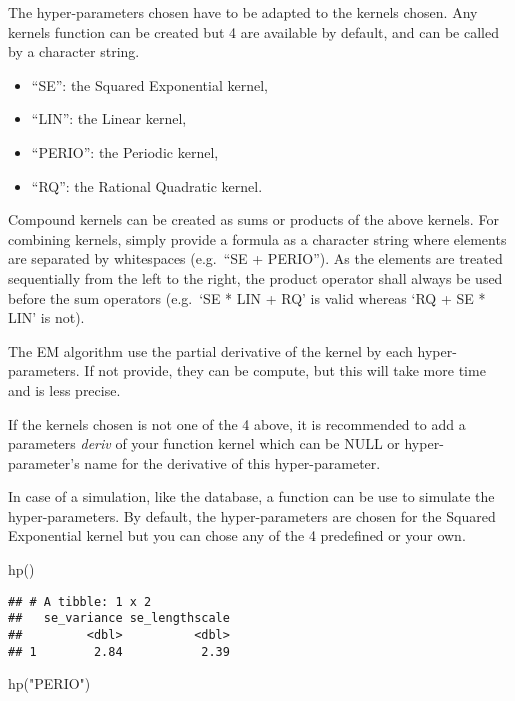 \documentclass[
]{article}
\newenvironment{Shaded}{\begin{snugshade}}{\end{snugshade}}
\newcommand{\FunctionTok}[1]{\textcolor[rgb]{0.00,0.00,0.00}{#1}}
\newcommand{\NormalTok}[1]{#1}
\newcommand{\StringTok}[1]{\textcolor[rgb]{0.31,0.60,0.02}{#1}}
\providecommand{\tightlist}{%
  \setlength{\itemsep}{0pt}\setlength{\parskip}{0pt}}
\begin{document}
The hyper-parameters chosen have to be adapted to the kernels chosen.
Any kernels function can be created but 4 are available by default, and
can be called by a character string.

\begin{itemize}
\tightlist
\item
  ``SE'': the Squared Exponential kernel,
\item
  ``LIN'': the Linear kernel,
\item
  ``PERIO'': the Periodic kernel,
\item
  ``RQ'': the Rational Quadratic kernel.
\end{itemize}

Compound kernels can be created as sums or products of the above
kernels. For combining kernels, simply provide a formula as a character
string where elements are separated by whitespaces (e.g.~``SE +
PERIO''). As the elements are treated sequentially from the left to the
right, the product operator shall always be used before the sum
operators (e.g.~`SE * LIN + RQ' is valid whereas `RQ + SE * LIN' is
not).

The EM algorithm use the partial derivative of the kernel by each
hyper-parameters. If not provide, they can be compute, but this will
take more time and is less precise.

If the kernels chosen is not one of the 4 above, it is recommended to
add a parameters \emph{deriv} of your function kernel which can be NULL
or hyper-parameter's name for the derivative of this hyper-parameter.

In case of a simulation, like the database, a function can be use to
simulate the hyper-parameters. By default, the hyper-parameters are
chosen for the Squared Exponential kernel but you can chose any of the 4
predefined or your own.

\begin{Shaded}
\begin{Highlighting}[]
\FunctionTok{hp}\NormalTok{()}
\end{Highlighting}
\end{Shaded}

\begin{verbatim}
## # A tibble: 1 x 2
##   se_variance se_lengthscale
##         <dbl>          <dbl>
## 1        2.84           2.39
\end{verbatim}

\begin{Shaded}
\begin{Highlighting}[]
\FunctionTok{hp}\NormalTok{(}\StringTok{"PERIO"}\NormalTok{)}
\end{Highlighting}
\end{Shaded}
\end{document}
